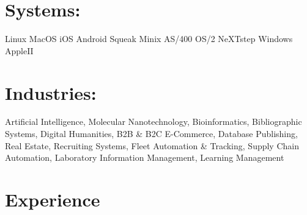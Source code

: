 \documentclass[line,margin,hidelinks]{res}
\begin{document}
\begin{resume}
\section{Systems:}
\begin{par}
Linux MacOS iOS Android Squeak Minix AS/400 OS/2 NeXTstep Windows AppleII
\end{par}

\section{Industries:}
\begin{par}
Artificial Intelligence,
Molecular Nanotechnology,
Bioinformatics,
Bibliographic Systems,
Digital Humanities,
B2B \& B2C E-Commerce,
Database Publishing,
Real Estate,
Recruiting Systems,
Fleet Automation \& Tracking,
Supply Chain Automation,
Laboratory Information Management,
Learning Management
\end{par}


\section{Experience}


\begin{position}
\end{position}


\begin{position}
\end{position}


\begin{position}
\end{position}




\begin{position}
\end{position}


\begin{position}
\end{position}


\begin{position}
\end{position}


\end{resume}
\end{document}
